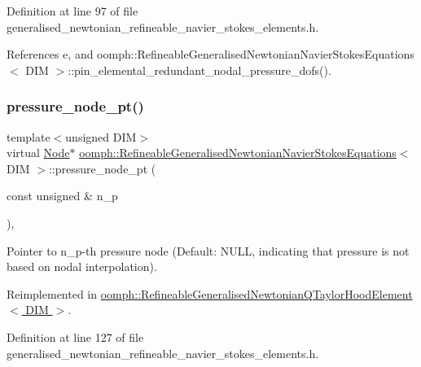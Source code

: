 Definition at line 97 of file generalised\+\_\+newtonian\+\_\+refineable\+\_\+navier\+\_\+stokes\+\_\+elements.\+h.



References e, and oomph\+::\+Refineable\+Generalised\+Newtonian\+Navier\+Stokes\+Equations$<$ D\+I\+M $>$\+::pin\+\_\+elemental\+\_\+redundant\+\_\+nodal\+\_\+pressure\+\_\+dofs().

\mbox{\label{classoomph_1_1RefineableGeneralisedNewtonianNavierStokesEquations_a7192c00c8efe7f1bc48d28122f120899}} 
\subsubsection{\texorpdfstring{pressure\+\_\+node\+\_\+pt()}{pressure\_node\_pt()}}
{\footnotesize\ttfamily template$<$unsigned D\+IM$>$ \\
virtual \hyperlink{classoomph_1_1Node}{Node}$\ast$ \hyperlink{classoomph_1_1RefineableGeneralisedNewtonianNavierStokesEquations}{oomph\+::\+Refineable\+Generalised\+Newtonian\+Navier\+Stokes\+Equations}$<$ D\+IM $>$\+::pressure\+\_\+node\+\_\+pt (\begin{DoxyParamCaption}\item[{const unsigned \&}]{n\+\_\+p }\end{DoxyParamCaption})\hspace{0.3cm}{\ttfamily [inline]}, {\ttfamily [virtual]}}



Pointer to n\+\_\+p-\/th pressure node (Default\+: N\+U\+LL, indicating that pressure is not based on nodal interpolation). 



Reimplemented in \hyperlink{classoomph_1_1RefineableGeneralisedNewtonianQTaylorHoodElement_a464263e4f629fd72b8b97329eb0a2194}{oomph\+::\+Refineable\+Generalised\+Newtonian\+Q\+Taylor\+Hood\+Element$<$ D\+I\+M $>$}.



Definition at line 127 of file generalised\+\_\+newtonian\+\_\+refineable\+\_\+navier\+\_\+stokes\+\_\+elements.\+h.



